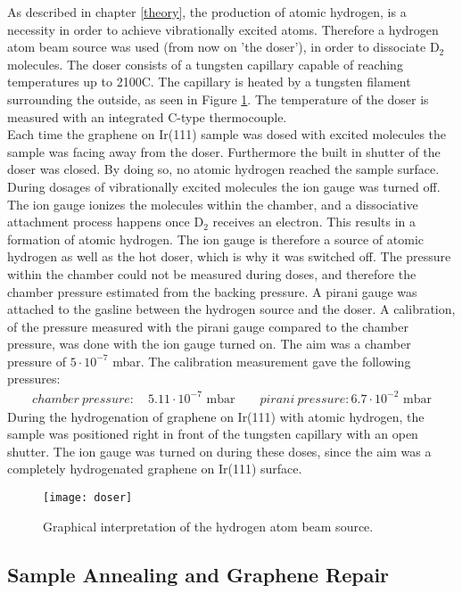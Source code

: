 As described in chapter \ref{theory}, the production of atomic hydrogen, is a necessity in order to achieve vibrationally excited atoms. Therefore a hydrogen atom beam source was used (from now on 'the doser'), in order to dissociate D$_2$ molecules. The doser consists of a tungsten capillary capable of reaching temperatures up to 2100\degree C.\cite{HABS} The capillary is heated by a tungsten filament surrounding the outside, as seen in Figure \ref{doser}. The temperature of the doser is measured with an integrated C-type thermocouple.\\
Each time the graphene on Ir(111) sample was dosed with excited molecules the sample was facing away from the doser. Furthermore the built in shutter of the doser was closed. By doing so, no atomic hydrogen reached the sample surface. During dosages of vibrationally excited molecules the ion gauge was turned off. The ion gauge ionizes the molecules within the chamber, and a dissociative attachment process happens once D$_2$ receives an electron. This results in a formation of atomic hydrogen.\cite{PhysRevLett.60.337} The ion gauge is therefore a source of atomic hydrogen as well as the hot doser, which is why it was switched off. The pressure within the chamber could not be measured during doses, and therefore the chamber pressure estimated from the backing pressure. A pirani gauge was attached to the gasline between the hydrogen source and the doser. A calibration, of the pressure measured with the pirani gauge compared to the chamber pressure, was done with the ion gauge turned on. The aim was a chamber pressure of $5\cdot 10^{-7}$ mbar. The calibration measurement gave the following pressures:
\begin{align}
chamber\: pressure: \quad 5.11 \cdot 10^{-7} \text{ mbar} \qquad pirani\: pressure: 6.7 \cdot 10^{-2} \text{ mbar}
\end{align}
During the hydrogenation of graphene on Ir(111) with atomic hydrogen, the sample was positioned right in front of the tungsten capillary with an open shutter. The ion gauge was turned on during these doses, since the aim was a completely hydrogenated graphene on Ir(111) surface.

\begin{figure}
  \centering
  \texttt{[image: doser]}
  \caption{Graphical interpretation of the hydrogen atom beam source.\cite{HABS}}
  \label{doser}
\end{figure}

\subsection{Sample Annealing and Graphene Repair}

